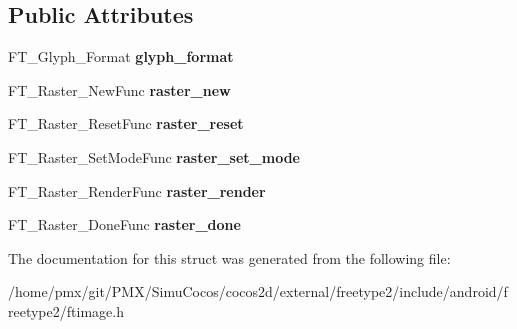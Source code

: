 \subsection*{Public Attributes}
\begin{DoxyCompactItemize}
\item 
\mbox{\label{structFT__Raster__Funcs___a741b43afa16f1f1b7f633cebd9f1d6a9}} 
F\+T\+\_\+\+Glyph\+\_\+\+Format {\bfseries glyph\+\_\+format}
\item 
\mbox{\label{structFT__Raster__Funcs___a31c9df9af6636df8a17a11bcd921b6a4}} 
F\+T\+\_\+\+Raster\+\_\+\+New\+Func {\bfseries raster\+\_\+new}
\item 
\mbox{\label{structFT__Raster__Funcs___a91e9decd6066090a5f306f33f9815d39}} 
F\+T\+\_\+\+Raster\+\_\+\+Reset\+Func {\bfseries raster\+\_\+reset}
\item 
\mbox{\label{structFT__Raster__Funcs___a3b37c781e54cf933cb60f57f2d45b32c}} 
F\+T\+\_\+\+Raster\+\_\+\+Set\+Mode\+Func {\bfseries raster\+\_\+set\+\_\+mode}
\item 
\mbox{\label{structFT__Raster__Funcs___a7479a3def4522ce2667d6772e7bb96a5}} 
F\+T\+\_\+\+Raster\+\_\+\+Render\+Func {\bfseries raster\+\_\+render}
\item 
\mbox{\label{structFT__Raster__Funcs___aecfd50bb6567d4442c997467cd68c857}} 
F\+T\+\_\+\+Raster\+\_\+\+Done\+Func {\bfseries raster\+\_\+done}
\end{DoxyCompactItemize}


The documentation for this struct was generated from the following file\+:\begin{DoxyCompactItemize}
\item 
/home/pmx/git/\+P\+M\+X/\+Simu\+Cocos/cocos2d/external/freetype2/include/android/freetype2/ftimage.\+h\end{DoxyCompactItemize}

